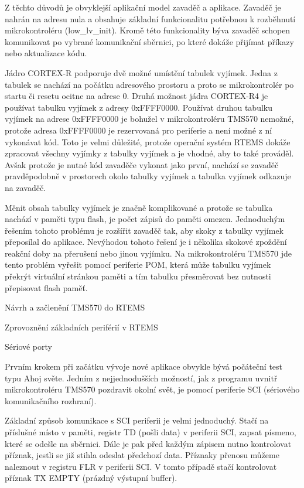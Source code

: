 	Z těchto důvodů je obvyklejší aplikační model zavaděč a aplikace.
Zavaděč je nahrán na adresu nula a obsahuje základní funkcionalitu potřebnou k rozběhnutí mikrokontroléru (low\_lv\_init).
Kromě této funkcionality býva zavaděč schopen komunikovat po vybrané komunikační sběrnici, po které dokáže přijímat příkazy nebo aktualizace kódu.
	
	Jádro CORTEX-R podporuje dvě možné umístění tabulek vyjímek.
Jedna z tabulek se nachází na počátku adresového prostoru a proto se mikrokontrolér po startu či resetu ocitne na adrese 0.
Druhá možnost jádra CORTEX-R4 je používat tabulku vyjímek z adresy 0xFFFF0000.
Používat druhou tabulku vyjímek na adrese 0xFFFF0000 je bohužel v mikrokontroléru TMS570 nemožné, protože adresa 0xFFFF0000 je rezervovaná pro periferie a není možné z ní vykonávat kód.
Toto je velmi důležité, protože operační systém RTEMS dokáže zpracovat všechny vyjímky z tabulky vyjímek a je vhodné, aby to také prováděl.
Avšak protože je nutné kód zavaděče vykonat jako první, nachází se zavaděč pravděpodobně v prostorech okolo tabulky vyjímek a tabulka vyjímek odkazuje na zavaděč.

	Měnit obsah tabulky vyjímek je značně komplikované a protože se tabulka nachází v paměti typu flash, je počet zápisů do paměti omezen.
Jednoduchým řešením tohoto problému je rozšířit zavaděč tak, aby skoky z tabulky vyjímek přeposílal do aplikace.
Nevýhodou tohoto řešení je i několika skokové zpoždění reakční doby na přerušení nebo jinou vyjímku.
Na mikrokontroléru TMS570 jde tento problém vyřešit pomocí periferie POM, která může tabulku vyjímek překrýt virtuální stránkou paměti a tím tabulku přesměrovat bez nutnosti přepisovat flash paměť. 
	 

\sec Návrh a začlenění TMS570 do RTEMS


\sec Zprovoznění základních periférií v RTEMS

\secc        Sériové porty

Prvním krokem při začátku vývoje nové aplikace obvykle bývá počáteční test typu Ahoj světe.
Jedním z nejjednodušších možností, jak z programu uvnitř mikrokontroléru TMS570 pozdravit okolní svět, je pomocí periferie SCI (sériového komunikačního rozhraní).

Základní způsob komunikace s SCI periferii je velmi jednoduchý.
Stačí na příslušné místo v paměti, registr TD (pošli data) v periferii SCI, zapsat písmeno, které se odešle na sběrnici.
Dále je pak před každým zápisem nutno kontrolovat příznak, jestli se již stihla odeslat předchozí data.
Příznaky přenosu můžeme naleznout v registru FLR v periferii SCI.
V tomto případě stačí kontrolovat příznak TX EMPTY (prázdný výstupní buffer).

